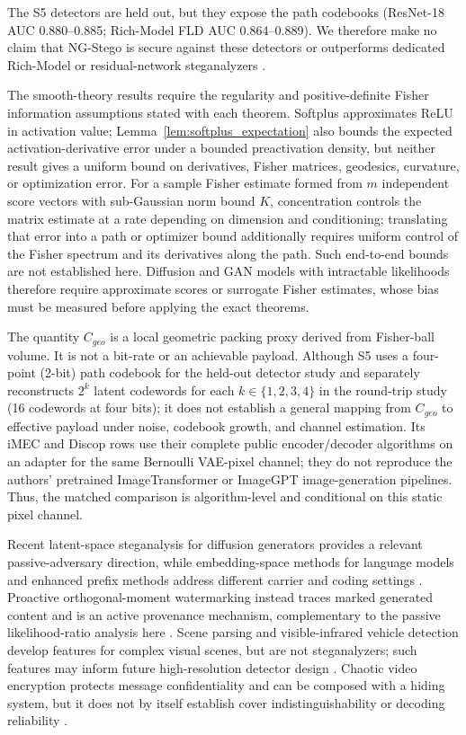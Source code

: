 \documentclass[a4paper,fleqn]{cas-dc}
\begin{document}
The S5 detectors are held out, but they expose the path codebooks
(ResNet-18 AUC 0.880--0.885; Rich-Model FLD AUC 0.864--0.889). We therefore make no
claim that NG-Stego is secure against these detectors or outperforms dedicated
Rich-Model or residual-network steganalyzers
\cite{fridrich2012rich,boroumand2019deep}.

The smooth-theory results require the regularity and positive-definite Fisher
information assumptions stated with each theorem. Softplus approximates ReLU
in activation value; Lemma~\ref{lem:softplus_expectation} also bounds the expected activation-derivative error under a bounded preactivation density, but neither result gives a uniform bound on derivatives,
Fisher matrices, geodesics, curvature, or optimization error. For a sample
Fisher estimate formed from $m$ independent score vectors with sub-Gaussian
norm bound $K$, concentration controls the matrix estimate at a rate depending
on dimension and conditioning; translating that error into a path or optimizer
bound additionally requires uniform control of the Fisher spectrum and its
derivatives along the path. Such end-to-end bounds are not established here.
Diffusion and GAN models with intractable likelihoods therefore require
approximate scores or surrogate Fisher estimates, whose bias must be measured
before applying the exact theorems.

The quantity $C_{geo}$ is a local geometric packing proxy derived from
Fisher-ball volume. It is not a bit-rate or an achievable payload. Although
S5 uses a four-point (2-bit) path codebook for the held-out detector study and separately reconstructs $2^k$ latent codewords for each $k\in\{1,2,3,4\}$ in the round-trip study (16 codewords at four bits); it
does not establish a general mapping from $C_{geo}$ to effective payload under
noise, codebook growth, and channel estimation. Its iMEC and Discop rows use
their complete public encoder/decoder algorithms on an adapter for the same
Bernoulli VAE-pixel channel; they do not reproduce the authors' pretrained
ImageTransformer or ImageGPT image-generation pipelines. Thus, the matched
comparison is algorithm-level and conditional on this static pixel channel.

Recent latent-space steganalysis for diffusion generators provides a relevant
passive-adversary direction, while embedding-space methods for language models
and enhanced prefix methods address different carrier and coding settings
\cite{levecque2026targeted,westphal2026hide,pan2025rethinking}. Proactive
orthogonal-moment watermarking instead traces marked generated content and is
an active provenance mechanism, complementary to the passive likelihood-ratio
analysis here \cite{wang2026focusdeepfakes,wang2026towardproactive}. Scene
parsing and visible-infrared vehicle detection develop features for complex
visual scenes, but are not steganalyzers; such features may inform future
high-resolution detector design \cite{liu2024humanparsing,wang2024maskmamba}.
Chaotic video encryption protects message confidentiality and can be composed
with a hiding system, but it does not by itself establish cover
indistinguishability or decoding reliability \cite{gao2025encryptstory,gao2025chaosreview}.
\end{document}
